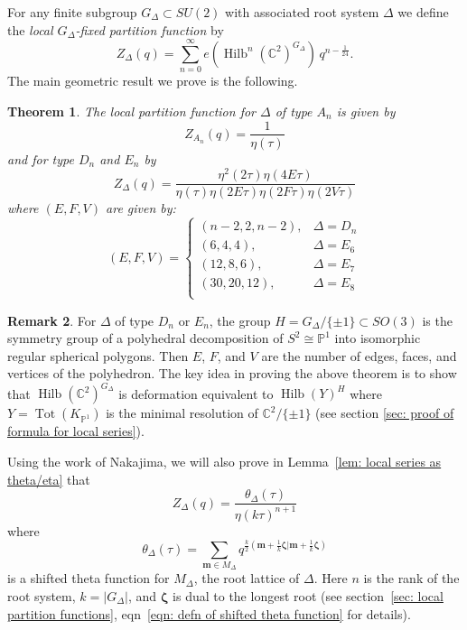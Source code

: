 \documentclass{amsart}
\newtheorem{theorem}{Theorem}[section]
\theoremstyle{definition}
\newtheorem{remark}[theorem]{Remark}
\newcommand{\CC} {{\mathbb C}}          %
\newcommand{\PP}{\mathbb{P}}
\newcommand{\mvec}{\bm{m}}
\newcommand{\zetavec}{\bm{\zeta }}
\newcommand{\Hilb}{\operatorname{Hilb}}
\newcommand{\jim}{\color{red}}
\begin{document}
For any finite subgroup $G_{\Delta}\subset SU(2)$ with associated root
system $\Delta$ we define the \emph{local $G_{\Delta }$-fixed
partition function} by
\[
Z_{\Delta} (q) = \sum_{n=0}^{\infty}
e\left(\Hilb^{n}(\CC^{2})^{G_{\Delta}} \right) \, q^{n-\frac{1}{24}} .
\]
The main geometric result we prove is the following. 
\begin{theorem}\label{thm: formula for local series (in intro)}
The local partition function for $\Delta$ of type $A_{n}$ is given by 
\[
Z_{A_{n}}(q) = \frac{1}{\eta (\tau )}
\]
and for type $D_{n}$ and $E_{n}$ by
\[
Z_{\Delta}(q) = \frac{\eta^{2}(2\tau )\eta (4E\tau )}{\eta (\tau )\eta
(2E\tau )\eta (2F\tau )\eta (2V\tau )}
\]
where $(E,F,V)$ are given by:
\[
(E,F,V) = \begin{cases}
(n-2,2,n-2), & \Delta =D_{n}\\
(6,4,4), & \Delta =E_{6}\\
(12,8,6), & \Delta =E_{7}\\
(30,20,12), & \Delta =E_{8}\\
\end{cases}
\]
\end{theorem}

{\jim
\begin{remark}
For $\Delta$ of type $D_{n}$ or $E_{n}$, the group $H =
G_{\Delta}/\{\pm 1 \}\subset SO(3)$ is the symmetry group of a
polyhedral decomposition of $S^{2}\cong \PP^{1}$ into isomorphic
regular spherical polygons. Then $E$, $F$, and $V$ are the number of
edges, faces, and vertices of the polyhedron.  The key idea in proving
the above theorem is to show that $\Hilb (\CC^{2})^{G_{\Delta}}$ is
deformation equivalent to $\Hilb (Y)^{H}$ where
$Y=\operatorname{Tot}(K_{\PP^{1}})$ is the minimal resolution of
$\CC^{2}/\{\pm 1 \}$ (see section \ref{sec: proof of formula for local
series}).
\end{remark}
}


Using the work of Nakajima, we will also prove in Lemma~\ref{lem: local
series as theta/eta} that
\[
Z_{\Delta}(q) =\frac{\theta_{\Delta}(\tau)}{\eta (k\tau )^{n+1}}
\]
where 
\[
\theta_{\Delta}(\tau ) = \sum_{\mvec \in M_{\Delta}}
q^{\frac{k}{2}\left(\mvec +\frac{1}{k}\zetavec |\mvec
+\frac{1}{k}\zetavec \right)}
\]
is a shifted theta function for $M_{\Delta} $, the root lattice of
$\Delta$. Here $n$ is the rank of the root system, $k=|G_{\Delta}|$,
and $\zetavec$ is dual to the longest root (see section~\ref{sec:
local partition functions}, eqn~\eqref{eqn: defn of shifted theta
function} for details).
\end{document}
